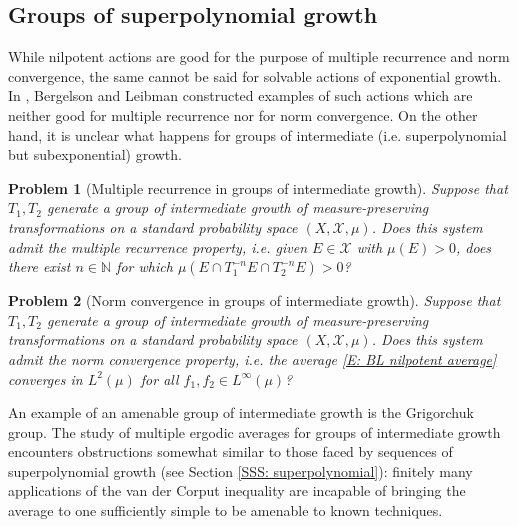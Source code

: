 \documentclass[11pt]{amsart}
\newtheorem{problem}{Problem}
\theoremstyle{definition}
\DeclareMathOperator*{\E}{\mathbb{E}}
\newcommand{\N}{{\mathbb N}}
\newcommand{\CX}{{\mathcal X}}
\newcommand{\1}{{\mathbf{1}}}
\begin{document}
\subsection{Groups of superpolynomial growth}
While nilpotent actions are good for the purpose of multiple recurrence and norm convergence, the same cannot be said for solvable actions of exponential growth. In \cite[Section 4]{BL02}, Bergelson and Leibman constructed examples of such actions which are neither good for multiple recurrence nor for norm convergence.
On the other hand, it is unclear what happens for groups of intermediate (i.e. superpolynomial but subexponential) growth.
\begin{problem}[Multiple recurrence in groups of intermediate growth]
    Suppose that $T_1, T_2$ generate a group of intermediate growth of measure-preserving transformations on a standard probability space $(X, \CX, \mu)$. Does this system admit the \emph{multiple recurrence property}, i.e. given $E\in\CX$ with $\mu(E)>0$, does there exist $n\in\N$ for which $\mu(E\cap T_1^{-n}E\cap T_2^{-n}E)>0$?
\end{problem}
\begin{problem}[Norm convergence in groups of intermediate growth]
    Suppose that $T_1, T_2$ generate a group of intermediate growth of measure-preserving transformations on a standard probability space $(X, \CX, \mu)$. Does this system admit the \emph{norm convergence property}, i.e. the average \eqref{E: BL nilpotent average}
    converges in $L^2(\mu)$ for all $f_1, f_2\in L^\infty(\mu)$?
\end{problem}
An example of an amenable group of intermediate growth is the Grigorchuk group. The study of multiple ergodic averages for groups of intermediate growth encounters obstructions somewhat similar to those faced by sequences of superpolynomial growth (see Section \ref{SSS: superpolynomial}): finitely many applications of the van der Corput inequality are incapable of bringing the average to one sufficiently simple to be amenable to known techniques.
\end{document}
